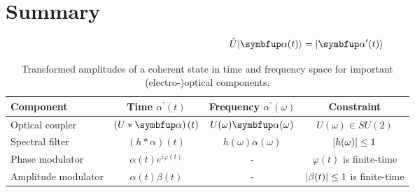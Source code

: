 \section*{Summary}

\begin{equation}
	\hat{U}
	\ket{\vb{\alpha}(t)}
	=
	\ket{\vb{\alpha}^\prime(t)}
\end{equation}

\begin{table}[htb]
	\centering	
	\begin{tabular}{lccc}
		\toprule
			Component & Time $\alpha^\prime(t)$ & Frequency $\alpha^\prime(\omega)$ & Constraint \\
		\midrule
			Optical coupler & $\left(U*\vb{\alpha}\right)(t)$ & $U(\omega)\vb{\alpha}(\omega)$ & $U(\omega)\in SU(2)$ \\
			Spectral filter & $\left(h*\alpha\right)(t)$ & $h(\omega)\alpha(\omega)$ & $\lvert h(\omega)\rvert\leq1$ \\
			Phase modulator & $\alpha(t)e^{i\varphi(t)}$ & - & $\varphi(t)$ is finite-time \\
			Amplitude modulator & $\alpha(t)\beta(t)$ & - & $\lvert\beta(t)\rvert\leq1$ is finite-time \\
		\bottomrule
	\end{tabular}
	\caption{Transformed amplitudes of a coherent state in time and frequency space for important (electro-)optical components.}
\end{table}